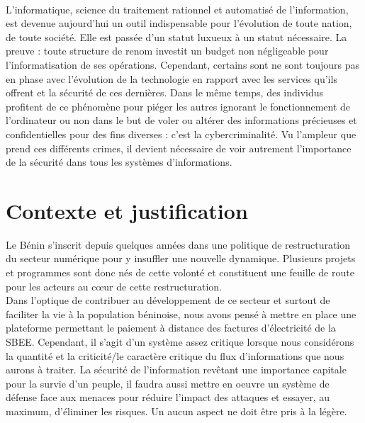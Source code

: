 \introduction
    \paragraph{}
      \small{
      L'informatique, science du traitement rationnel et automatisé de l'information, est devenue aujourd'hui un outil indispensable pour l'évolution de toute nation, de toute société. Elle est passée d'un statut luxueux à un statut nécessaire. La preuve : toute structure de renom investit un budget non n\'egligeable pour l'informatisation de ses opérations. Cependant, certains sont ne sont toujours pas en phase avec l'\'evolution de la technologie en rapport avec les services qu'ils offrent et la s\'ecurit\'e de ces derni\`eres. Dans le m\^eme temps, des individus profitent de ce ph\'enom\`ene pour pi\'eger les autres ignorant le fonctionnement de l'ordinateur ou non dans le but de voler ou alt\'erer des informations précieuses et confidentielles pour des fins diverses : c'est la cybercriminalité. Vu l'ampleur que prend ces diff\'erents crimes, il devient n\'ecessaire de voir autrement l'importance de la s\'ecurit\'e dans tous les syst\`emes d'informations.
    
    \section{Contexte et justification}
    
	Le Bénin s’inscrit depuis quelques années dans une politique de restructuration du secteur numérique pour y insuffler une nouvelle dynamique. Plusieurs projets et programmes sont donc nés de cette volonté et constituent une feuille de route pour les acteurs au cœur de cette restructuration. 
	\\Dans l'optique de contribuer au d\'eveloppement de ce secteur et surtout de faciliter la vie \`a la population b\'eninoise, nous avons pens\'e \`a mettre en place une plateforme permettant le paiement \`a distance des factures d'\'electricit\'e de la SBEE. Cependant, il s'agit d'un syst\`eme assez critique lorsque nous consid\'erons la quantit\'e et la criticit\'e/le caractère critique  du flux d'informations que nous aurons \`a traiter. La sécurité de l'information revêtant une importance capitale pour la survie d'un peuple, il faudra aussi mettre en oeuvre un système de défense face aux menaces pour réduire l'impact des attaques et essayer, au maximum, d'éliminer les risques. Un aucun aspect ne doit \^etre pris \`a la l\'eg\`ere.
	}
    

